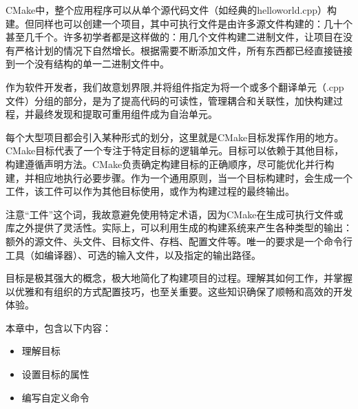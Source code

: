 CMake中，整个应用程序可以从单个源代码文件（如经典的helloworld.cpp）构建。但同样也可以创建一个项目，其中可执行文件是由许多源文件构建的：几十个甚至几千个。许多初学者都是这样做的：用几个文件构建二进制文件，让项目在没有严格计划的情况下自然增长。根据需要不断添加文件，所有东西都已经直接链接到一个没有结构的单一二进制文件中。

作为软件开发者，我们故意划界限,并将组件指定为将一个或多个翻译单元（.cpp文件）分组的部分，是为了提高代码的可读性，管理耦合和关联性，加快构建过程，并最终发现和提取可重用组件成为自治单元。

每个大型项目都会引入某种形式的划分，这里就是CMake目标发挥作用的地方。CMake目标代表了一个专注于特定目标的逻辑单元。目标可以依赖于其他目标，构建遵循声明方法。CMake负责确定构建目标的正确顺序，尽可能优化并行构建，并相应地执行必要步骤。作为一个通用原则，当一个目标构建时，会生成一个工件，该工件可以作为其他目标使用，或作为构建过程的最终输出。

注意“工件”这个词，我故意避免使用特定术语，因为CMake在生成可执行文件或库之外提供了灵活性。实际上，可以利用生成的构建系统来产生各种类型的输出：额外的源文件、头文件、目标文件、存档、配置文件等。唯一的要求是一个命令行工具（如编译器）、可选的输入文件，以及指定的输出路径。

目标是极其强大的概念，极大地简化了构建项目的过程。理解其如何工作，并掌握以优雅和有组织的方式配置技巧，也至关重要。这些知识确保了顺畅和高效的开发体验。

本章中，包含以下内容：

\begin{itemize}
\item
理解目标

\item
设置目标的属性

\item
编写自定义命令
\end{itemize}















































